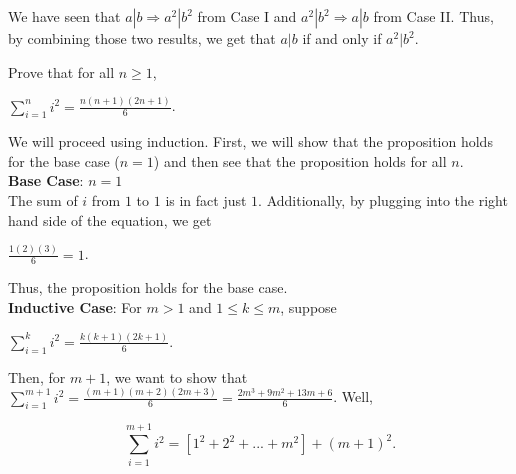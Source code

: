 \documentclass[12pt]{article}
\newenvironment{problem}[2][Problem]{\begin{trivlist}
\item[\hskip \labelsep {\bfseries #1}\hskip \labelsep {\bfseries #2.}]}{\end{trivlist}}
\begin{document}
\begin{problem}{4}
\noindent
We have seen that $a|b \Longrightarrow a^2|b^2$ from Case I and $a^2|b^2 \Longrightarrow a|b$ from Case II. Thus, by combining those two results, we get that $a|b$ if and only if $a^2|b^2$. \qedsymbol
\end{problem}


\begin{problem}{5}
Prove that for all  $n \geq 1$, 

\begin{center}
$\sum\limits_{i=1}^n i^2 = \frac{n(n+1)(2n+1)}{6}$.
\end{center}

\noindent
We will proceed using induction. First, we will show that the proposition holds for the base case ($n=1$) and then see that the proposition holds for all $n$. \\

\noindent
\textbf{Base Case}: $n=1$ \\

\noindent
The sum of $i$ from $1$ to $1$ is in fact just $1$. Additionally, by plugging into the right hand side of the equation, we get 

\begin{center}
$\frac{1(2)(3)}{6}=1$.
\end{center}

\noindent
Thus, the proposition holds for the base case. \\

\noindent
\textbf{Inductive Case}: For $m>1$ and $1 \leq k \leq m$, suppose \\
\begin{center}
$\sum\limits_{i=1}^k i^2 = \frac{k(k+1)(2k+1)}{6}$.
\end{center}

\noindent
Then, for $m+1$, we want to show that $\sum\limits_{i=1}^{m+1} i^2 = \frac{(m+1)(m+2)(2m+3)}{6}=\frac{2m^3+9m^2+13m+6}{6}$. Well, 

\begin{equation}
\sum\limits_{i=1}^{m+1} i^2 = [1^2 + 2^2 + ... + m^2] + (m+1)^2.
\end{equation}


\end{problem}
\end{document}
